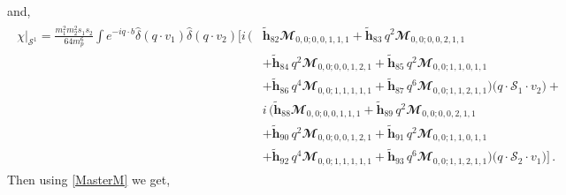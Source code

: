 and,
\begin{align}
    \begin{split}
        \chi\Big|_{\mathcal{S}^1}= \frac{m_1^2 m_2^2 s_1 s_2}{64 m_p^6}\int e^{-i q\cdot b}\hat\delta(q\cdot v_1)\hat\delta(q\cdot v_2)\Bigg[i\,\Bigg(&\boldsymbol{\tilde h}_{82}\mathbfcal{M}_{0,0;0,0,1,1,1}+\boldsymbol{\tilde h}_{83}\,q^2\mathbfcal{M}_{0,0;0,0,2,1,1}\\ &+\boldsymbol{\tilde h}_{84}\,q^2\mathbfcal{M}_{0,0;0,0,1,2,1}+\boldsymbol{\tilde h}_{85}\,q^2\mathbfcal{M}_{0,0;1,1,0,1,1}\\&+\boldsymbol{\tilde h}_{86}\,q^4\mathbfcal{M}_{0,0;1,1,1,1,1}+\boldsymbol{\tilde h}_{87}\,q^6\mathbfcal{M}_{0,0;1,1,2,1,1}\Bigg)\big(q\cdot\mathcal{S}_1\cdot v_2\big)+\\&i\,\Bigg(\boldsymbol{\tilde h}_{88}\mathbfcal{M}_{0,0;0,0,1,1,1}+\boldsymbol{\tilde h}_{89}\,q^2\mathbfcal{M}_{0,0;0,0,2,1,1}\\ &+\boldsymbol{\tilde h}_{90}\,q^2\mathbfcal{M}_{0,0;0,0,1,2,1}+\boldsymbol{\tilde h}_{91}\,q^2\mathbfcal{M}_{0,0;1,1,0,1,1}\\&+\boldsymbol{\tilde h}_{92}\,q^4\mathbfcal{M}_{0,0;1,1,1,1,1}+\boldsymbol{\tilde h}_{93}\,q^6\mathbfcal{M}_{0,0;1,1,2,1,1}\Bigg)\big(q\cdot\mathcal{S}_2\cdot v_1\big)\Bigg]\,.
    \end{split}
\end{align}
Then using \eqref{MasterM} we get,

